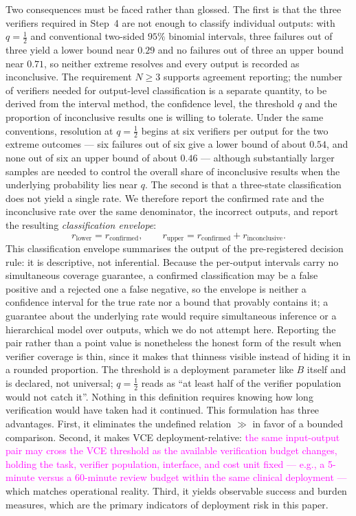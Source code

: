 \documentclass[11pt]{article}
\newcommand{\rev}[1]{\textcolor{magenta}{#1}}
\newcommand{\viola}[1]{\textcolor[HTML]{7030A0}{#1}}
\newcommand{\rev}[1]{#1}
\newcommand{\viola}[1]{#1}
\begin{document}
{{Two consequences must be faced rather than glossed. The first is that the three verifiers required in Step~4 are not enough to classify individual outputs: with $q=\tfrac12$ and conventional two-sided $95\%$ binomial intervals, three failures out of three yield a lower bound near $0.29$ and no failures out of three an upper bound near $0.71$, so neither extreme resolves and every output is recorded as inconclusive. The requirement $N\ge 3$ supports agreement reporting; the number of verifiers needed for output-level classification is a separate quantity, to be derived from the interval method, the confidence level, the threshold $q$ and the proportion of inconclusive results one is willing to tolerate. \viola{Under the same conventions, resolution at $q=\tfrac12$ begins at six verifiers per output for the two extreme outcomes --- six failures out of six give a lower bound of about $0.54$, and none out of six an upper bound of about $0.46$ --- although substantially larger samples are needed to control the overall share of inconclusive results when the underlying probability lies near $q$.}
The second is that a three-state classification does not yield a single rate. We therefore report the confirmed rate and the inconclusive rate over the same denominator, the incorrect outputs, and report the resulting \emph{classification envelope}:}
\[
r_{\mathrm{lower}} = r_{\mathrm{confirmed}}, \qquad
r_{\mathrm{upper}} = r_{\mathrm{confirmed}} + r_{\mathrm{inconclusive}} .
\]
\viola{This classification envelope summarises the output of the pre-registered decision rule: it is descriptive, not inferential. Because the per-output intervals carry no simultaneous coverage guarantee, a confirmed classification may be a false positive and a rejected one a false negative, so the envelope is neither a confidence interval for the true rate nor a bound that provably contains it; a guarantee about the underlying rate would require simultaneous inference or a hierarchical model over outputs, which we do not attempt here. Reporting the pair rather than a point value is nonetheless the honest form of the result when verifier coverage is thin, since it makes that thinness visible instead of hiding it in a rounded proportion.} The threshold is a deployment parameter like $B$ itself and is declared, not universal; $q=\tfrac{1}{2}$ reads as ``at least half of the verifier population would not catch it''. Nothing in this definition requires knowing how long verification would have taken had it continued.}
{This formulation has three advantages. First, it eliminates the undefined relation $\gg$ in favor of a bounded comparison.
Second, it makes VCE deployment-relative: \rev{the same input-output pair may cross the VCE threshold as the available verification budget changes, holding the task, verifier population, interface, and cost unit fixed --- e.g., a 5-minute versus a 60-minute review budget within the same clinical deployment ---} which matches operational reality.
\viola{Third, it yields observable success and burden measures, which are the primary indicators of deployment risk in this paper.}}
\end{document}
